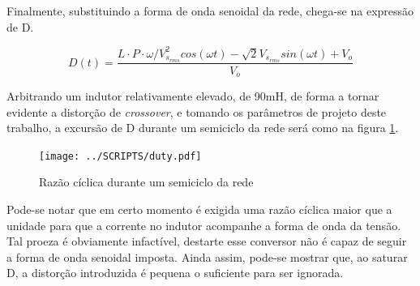 \documentclass[
        12pt,
        openany, %
        oneside, %
        a4paper,			
        english,			
        brazil
        ]{abntbibufjf}
\begin{document}
Finalmente, substituindo a forma de onda senoidal da rede, chega-se na expressão de D.

\begin{equation}
D(t)=\frac{L\cdot P\cdot \omega / V_{s_{rms}}^2 cos(\omega t)-\sqrt{2}V_{s_{rms}}sin(\omega t)+V_o}{V_o}
\label{duty_equation}
\end{equation}








Arbitrando um indutor relativamente elevado, de 90mH, de forma a tornar evidente a distorção de \textit{crossover}, e tomando os parâmetros de projeto deste trabalho, a excursão de D durante um semiciclo da rede será como na figura \ref{duty_cmc}.

\begin{figure}[!h]
	\centering
	\caption{Razão cíclica durante um semiciclo da rede}
	\texttt{[image: ../SCRIPTS/duty.pdf]}\\
	\label{duty_cmc}
\end{figure}


Pode-se notar que em certo momento é exigida uma razão cíclica maior que a unidade para que a corrente no indutor acompanhe a forma de onda da tensão. Tal proeza é obviamente infactível, destarte esse conversor não é capaz de seguir a forma de onda senoidal imposta. Ainda assim, pode-se mostrar que, ao saturar D, a distorção introduzida é pequena o suficiente para ser ignorada.
\end{document}
